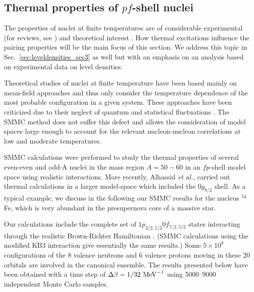 \documentclass[rmp,aps,floatfix]{revtex4}
\begin{document}
\noindent
\subsection{Thermal properties of $pf$-shell nuclei}

The properties of nuclei at finite temperatures are of considerable
experimental (for reviews, see \cite{Suraud,Snover})
and theoretical interest \cite{Alhassid1,Egido}.
How thermal excitations influence the pairing properties will be
the main focus of this section. We address this topic in 
Sec.~\ref{sec:leveldensities_sec3} as well but with an emphasis on
an analysis based on experimental data on level densities.

Theoretical studies of nuclei at finite temperature have been based mainly
on mean-field approaches and thus only consider the temperature dependence
of the most probable configuration in a given system. These approaches
have been criticized due to their neglect of quantum and statistical
fluctuations \cite{Dukelsky}. The SMMC method does not suffer this defect and
allows the consideration of model spaces large enough to account
for the relevant nucleon-nucleon correlations at low and moderate
temperatures.

SMMC calculations were performed to study the 
thermal properties of several even-even  and odd-A nuclei in the mass 
region $A=50-60$ \cite{Dean95,Langanke95b} in an $fp$-shell model 
space using realistic interactions.
More recently, Alhassid {\em et al.}, carried out thermal 
calculations in a larger model-space which included the $0g_{9/2}$ shell.
As a typical example, we discuss
in the following our SMMC results for the nucleus $^{54}$Fe, which
is very abundant in the presupernova core of a massive star.

Our calculations include the complete set of $1p_{3/2,1/2}0f_{7/2,5/2}$
states interacting through the realistic Brown-Richter Hamiltonian
\cite{Richter}.
(SMMC calculations using the modified KB3 interaction \cite{kb3a,kb3b} 
give essentially
the same results.) 
Some
$5\times10^9$ configurations of the 8 valence neutrons and 6 valence protons
moving in these 20 orbitals are involved in the canonical ensemble. 
The
results presented below have been obtained with a
time step of $\Delta\beta=1/32~{\rm MeV}^{-1}$ using 5000--9000 independent
Monte Carlo samples. 
\end{document}
